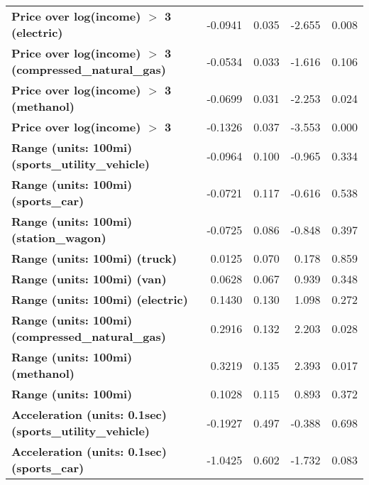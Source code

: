 \begin{tabular}{lrrrr}
\textbf{Price over log(income) $>$ 3 (electric)}                 &      -0.0941  &        0.035     &    -2.655  &         0.008        \\
\textbf{Price over log(income) $>$ 3 (compressed\_natural\_gas)} &      -0.0534  &        0.033     &    -1.616  &         0.106        \\
\textbf{Price over log(income) $>$ 3 (methanol)}                 &      -0.0699  &        0.031     &    -2.253  &         0.024        \\
\textbf{Price over log(income) $>$ 3}                            &      -0.1326  &        0.037     &    -3.553  &         0.000        \\
\textbf{Range (units: 100mi) (sports\_utility\_vehicle)}         &      -0.0964  &        0.100     &    -0.965  &         0.334        \\
\textbf{Range (units: 100mi) (sports\_car)}                      &      -0.0721  &        0.117     &    -0.616  &         0.538        \\
\textbf{Range (units: 100mi) (station\_wagon)}                   &      -0.0725  &        0.086     &    -0.848  &         0.397        \\
\textbf{Range (units: 100mi) (truck)}                            &       0.0125  &        0.070     &     0.178  &         0.859        \\
\textbf{Range (units: 100mi) (van)}                              &       0.0628  &        0.067     &     0.939  &         0.348        \\
\textbf{Range (units: 100mi) (electric)}                         &       0.1430  &        0.130     &     1.098  &         0.272        \\
\textbf{Range (units: 100mi) (compressed\_natural\_gas)}         &       0.2916  &        0.132     &     2.203  &         0.028        \\
\textbf{Range (units: 100mi) (methanol)}                         &       0.3219  &        0.135     &     2.393  &         0.017        \\
\textbf{Range (units: 100mi)}                                    &       0.1028  &        0.115     &     0.893  &         0.372        \\
\textbf{Acceleration (units: 0.1sec) (sports\_utility\_vehicle)} &      -0.1927  &        0.497     &    -0.388  &         0.698        \\
\textbf{Acceleration (units: 0.1sec) (sports\_car)}              &      -1.0425  &        0.602     &    -1.732  &         0.083        \\

\end{tabular}
